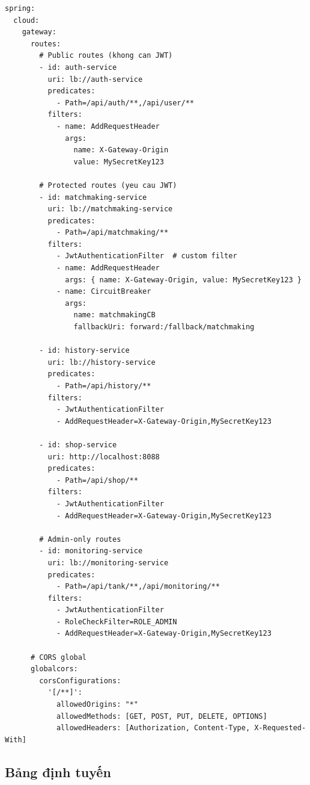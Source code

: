 \documentclass[12pt,a4paper]{report}
\begin{document}
\begin{lstlisting}[style=javaStyle, caption={Cấu hình route và filter trong Spring Cloud Gateway}, label={lst:gatewayroutes}]
spring:
  cloud:
    gateway:
      routes:
        # Public routes (khong can JWT)
        - id: auth-service
          uri: lb://auth-service
          predicates:
            - Path=/api/auth/**,/api/user/**
          filters:
            - name: AddRequestHeader
              args:
                name: X-Gateway-Origin
                value: MySecretKey123

        # Protected routes (yeu cau JWT)
        - id: matchmaking-service
          uri: lb://matchmaking-service
          predicates:
            - Path=/api/matchmaking/**
          filters:
            - JwtAuthenticationFilter  # custom filter
            - name: AddRequestHeader
              args: { name: X-Gateway-Origin, value: MySecretKey123 }
            - name: CircuitBreaker
              args:
                name: matchmakingCB
                fallbackUri: forward:/fallback/matchmaking

        - id: history-service
          uri: lb://history-service
          predicates:
            - Path=/api/history/**
          filters:
            - JwtAuthenticationFilter
            - AddRequestHeader=X-Gateway-Origin,MySecretKey123

        - id: shop-service
          uri: http://localhost:8088
          predicates:
            - Path=/api/shop/**
          filters:
            - JwtAuthenticationFilter
            - AddRequestHeader=X-Gateway-Origin,MySecretKey123

        # Admin-only routes
        - id: monitoring-service
          uri: lb://monitoring-service
          predicates:
            - Path=/api/tank/**,/api/monitoring/**
          filters:
            - JwtAuthenticationFilter
            - RoleCheckFilter=ROLE_ADMIN
            - AddRequestHeader=X-Gateway-Origin,MySecretKey123

      # CORS global
      globalcors:
        corsConfigurations:
          '[/**]':
            allowedOrigins: "*"
            allowedMethods: [GET, POST, PUT, DELETE, OPTIONS]
            allowedHeaders: [Authorization, Content-Type, X-Requested-With]
\end{lstlisting}

\subsection{Bảng định tuyến}
\end{document}
